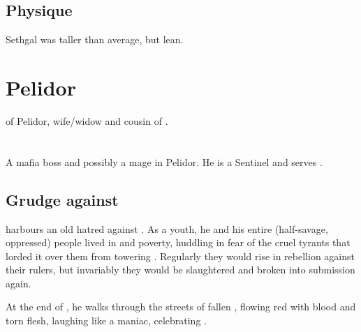 \subsection{Physique}
Sethgal was taller than average, but lean. 

















\section{\Tiroco{} Pelidor}
\Rinyuth of Pelidor, wife/widow and cousin of . 















\section{\Urban}
A mafia boss and possibly a mage in Pelidor. 
He is a Sentinel and serves . 







\subsection{Grudge against \Malcur}
\Urban{} harbours an old hatred against \Malcur. As a youth, he and his entire (half-savage, oppressed) people lived in \squalour and poverty, huddling in fear of the cruel tyrants that lorded it over them from towering \Malcur. Regularly they would rise in rebellion against their rulers, but invariably they would be slaughtered and broken into submission again. 

At the end of \emph{\TwilightAngelRemember{}}, he walks through the streets of fallen \Malcur, flowing red with blood and torn flesh, laughing like a maniac, celebrating . 























